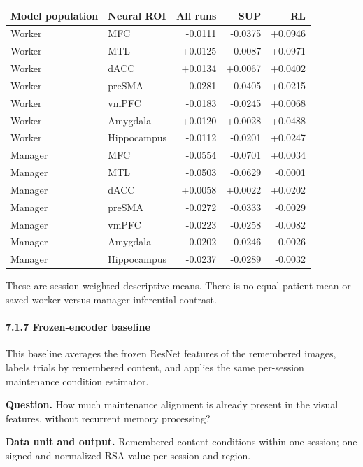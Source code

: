 \documentclass[
  10pt,
]{article}
\begin{document}
\begin{longtable}[]{@{}llrrr@{}}
\toprule\noalign{}
Model population & Neural ROI & All runs & SUP & RL \\
\midrule\noalign{}
\endhead
\bottomrule\noalign{}
\endlastfoot
Worker & MFC & -0.0111 & -0.0375 & +0.0946 \\
Worker & MTL & +0.0125 & -0.0087 & +0.0971 \\
Worker & dACC & +0.0134 & +0.0067 & +0.0402 \\
Worker & preSMA & -0.0281 & -0.0405 & +0.0215 \\
Worker & vmPFC & -0.0183 & -0.0245 & +0.0068 \\
Worker & Amygdala & +0.0120 & +0.0028 & +0.0488 \\
Worker & Hippocampus & -0.0112 & -0.0201 & +0.0247 \\
Manager & MFC & -0.0554 & -0.0701 & +0.0034 \\
Manager & MTL & -0.0503 & -0.0629 & -0.0001 \\
Manager & dACC & +0.0058 & +0.0022 & +0.0202 \\
Manager & preSMA & -0.0272 & -0.0333 & -0.0029 \\
Manager & vmPFC & -0.0223 & -0.0258 & -0.0082 \\
Manager & Amygdala & -0.0202 & -0.0246 & -0.0026 \\
Manager & Hippocampus & -0.0237 & -0.0289 & -0.0032 \\
\end{longtable}

These are session-weighted descriptive means. There is no equal-patient
mean or saved worker-versus-manager inferential contrast.

\hypertarget{frozen-encoder-baseline}{%
\paragraph{7.1.7 Frozen-encoder
baseline}\label{frozen-encoder-baseline}}

This baseline averages the frozen ResNet features of the remembered
images, labels trials by remembered content, and applies the same
per-session maintenance condition estimator.

\textbf{Question.} How much maintenance alignment is already present in
the visual features, without recurrent memory processing?

\textbf{Data unit and output.} Remembered-content conditions within one
session; one signed and normalized RSA value per session and region.
\end{document}
